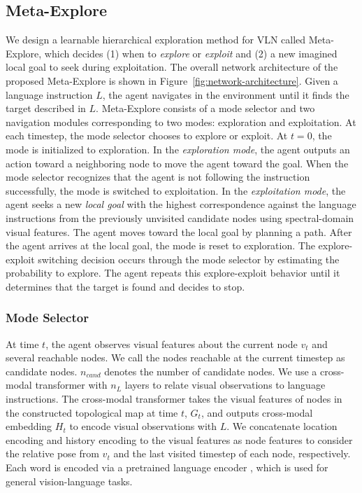 \documentclass[10pt,twocolumn,letterpaper]{article}
\begin{document}
\subsection{Meta-Explore}
\vspace{-0.15cm}
\font=2.0pt
We design a learnable hierarchical exploration method for VLN called Meta-Explore, which decides (1) when to \textit{explore} or \textit{exploit} and (2) a new imagined local goal to seek during exploitation. The overall network architecture of the proposed Meta-Explore is shown in Figure~\ref{fig:network-architecture}. Given a language instruction $L$, the agent navigates in the environment until it finds the target described in $L$. Meta-Explore consists of a mode selector and two navigation modules corresponding to two modes: exploration and exploitation. At each timestep, the mode selector chooses to explore or exploit. At $t=0$, the mode is initialized to exploration. In the \textit{exploration mode}, the agent outputs an action toward a neighboring node to move the agent toward the goal. When the mode selector recognizes that the agent is not following the instruction successfully, the mode is switched to exploitation. In the \textit{exploitation mode}, the agent seeks a new \textit{local goal} with the highest correspondence against the language instructions from the previously unvisited candidate nodes using spectral-domain visual features. The agent moves toward the local goal by planning a path. After the agent arrives at the local goal, the mode is reset to exploration. The explore-exploit switching decision occurs through the mode selector by estimating the probability to explore. The agent repeats this explore-exploit behavior until it determines that the target is found and decides to stop.
\vspace{-0.4cm}

\subsubsection{Mode Selector}
\vspace{-0.2cm}
\font=2.2pt
At time $t$, the agent observes visual features about the current node $v_t$ and several reachable nodes. We call the nodes reachable at the current timestep as candidate nodes. $n_{cand}$ denotes the number of candidate nodes.
We use a cross-modal transformer with $n_L$ layers to relate visual observations to language instructions. The cross-modal transformer takes the visual features of nodes in the constructed topological map at time $t$, $G_t$, and outputs cross-modal embedding $H_t$ to encode visual observations with $L$. We concatenate location encoding and history encoding \cite{chen2022think} to the visual features as node features to consider the relative pose from $v_t$ and the last visited timestep of each node, respectively. Each word is encoded via a pretrained language encoder \cite{tan2019lxmert}, which is used for general vision-language tasks. 
\end{document}
